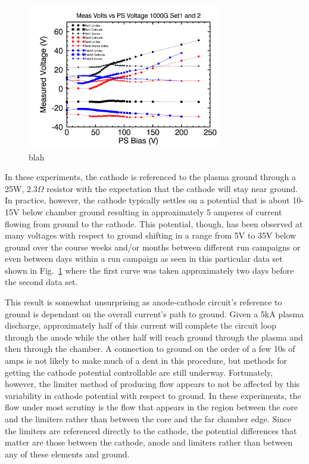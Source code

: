 \documentclass[aip,pop,amsmath,amssymb,preprint,superscriptaddress]{revtex4-1} %
\begin{document}
\begin{figure}[!htbp]
\centerline{
\includegraphics[width=8.5cm]{an_cath}}
\caption{\label{fig:an_cath} blah}
\end{figure}

In these experiments, the cathode is referenced to the plasma ground through a 25W, $2.3\Omega$ resistor with the expectation that the cathode will stay near ground. In practice, however, the cathode typically settles on a potential that is about 10-15V below chamber ground resulting in approximately 5 amperes of current flowing from ground to the cathode. This potential, though, has been observed at many voltages with respect to ground shifting in a range from 5V to 35V below ground over the course weeks and/or months between different run campaigns or even between days within a run campaign as seen in this particular data set shown in Fig.~\ref{fig:an_cath} where the first curve was taken approximately two days before the second data set.

This result is somewhat unsurprising as anode-cathode circuit's reference to ground is dependant on the overall current's path to ground. Given a 5kA plasma discharge, approximately half of this current will complete the circuit loop through the anode while the other half will reach ground through the plasma and then through the chamber. A connection to ground on the order of a few 10s of amps is not likely to make much of a dent in this procedure, but methods for getting the cathode potential controllable are still underway. Fortunately, however, the limiter method of producing flow appears to not be affected by this variability in cathode potential with respect to ground. In these experiments, the flow under most scrutiny is the flow that appears in the region between the core and the limiters rather than between the core and the far chamber edge. Since the limiters are referenced directly to the cathode, the potential differences that matter are those between the cathode, anode and limiters rather than between any of these elements and ground.
\end{document}
